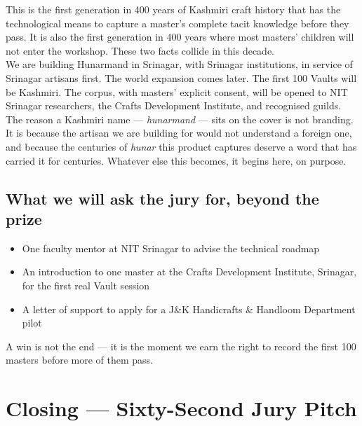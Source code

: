 \documentclass[11pt, a4paper]{article}
\begin{document}
\begin{kashmirbox}
This is the first generation in 400 years of Kashmiri craft history that has the technological means to capture a master's complete tacit knowledge before they pass. It is also the first generation in 400 years where most masters' children will not enter the workshop. These two facts collide in this decade.\\[5pt]
We are building Hunarmand in Srinagar, with Srinagar institutions, in service of Srinagar artisans first. The world expansion comes later. The first 100 Vaults will be Kashmiri. The corpus, with masters' explicit consent, will be opened to NIT Srinagar researchers, the Crafts Development Institute, and recognised guilds.\\[5pt]
The reason a Kashmiri name --- {\itshape hunarmand} --- sits on the cover is not branding. It is because the artisan we are building for would not understand a foreign one, and because the centuries of {\itshape hunar} this product captures deserve a word that has carried it for centuries. Whatever else this becomes, it begins here, on purpose.
\end{kashmirbox}

\subsection{What we will ask the jury for, beyond the prize}

\begin{itemize}
  \item One faculty mentor at NIT Srinagar to advise the technical roadmap
  \item An introduction to one master at the Crafts Development Institute, Srinagar, for the first real Vault session
  \item A letter of support to apply for a J\&K Handicrafts \& Handloom Department pilot
\end{itemize}

A win is not the end --- it is the moment we earn the right to record the first 100 masters before more of them pass.

\enlargethispage{4.5cm}

\section{Closing --- Sixty-Second Jury Pitch}
\end{document}
